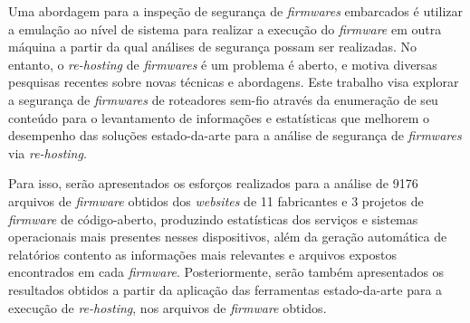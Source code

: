 
Uma abordagem para a inspeção de segurança de \textit{firmwares} embarcados é utilizar a emulação ao nível de sistema para realizar a execução do \textit{firmware} em outra máquina a partir da qual análises de segurança possam ser realizadas. No entanto, o \textit{re-hosting} de \textit{firmwares} é um problema é aberto, e motiva diversas pesquisas recentes sobre novas técnicas e abordagens. Este trabalho visa explorar a segurança de \textit{firmwares} de roteadores sem-fio através da enumeração de seu conteúdo para o levantamento de informações e estatísticas que melhorem o desempenho das soluções estado-da-arte para a análise de segurança de \textit{firmwares} via \textit{re-hosting}.

Para isso, serão apresentados os esforços realizados para a análise de 9176 arquivos de \textit{firmware} obtidos dos \textit{websites} de 11 fabricantes e 3 projetos de \textit{firmware} de código-aberto, produzindo estatísticas dos serviços e sistemas operacionais mais presentes nesses dispositivos, além da geração automática de relatórios contento as informações mais relevantes e arquivos expostos encontrados em cada \textit{firmware}. Posteriormente, serão também apresentados os resultados obtidos a partir da aplicação das ferramentas estado-da-arte para a execução de \textit{re-hosting}, nos arquivos de \textit{firmware} obtidos.